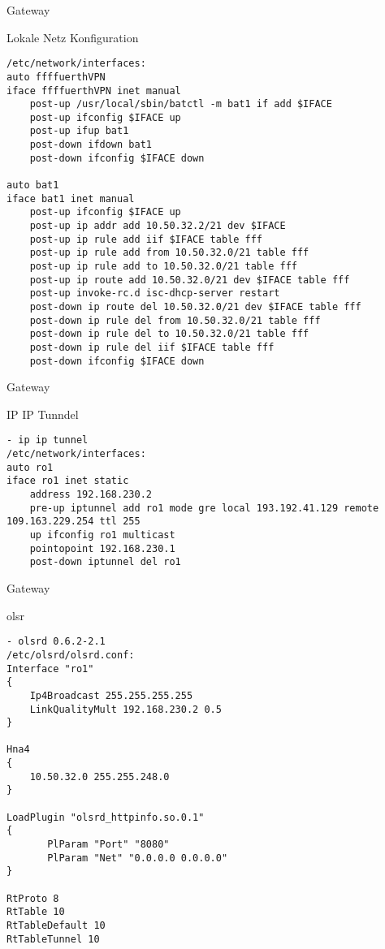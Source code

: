 \begin{frame}[fragile]{Gateway}
    \begin{block}{Lokale Netz Konfiguration}
        \begin{lstlisting}
/etc/network/interfaces:
auto ffffuerthVPN
iface ffffuerthVPN inet manual
    post-up /usr/local/sbin/batctl -m bat1 if add $IFACE
    post-up ifconfig $IFACE up
    post-up ifup bat1
    post-down ifdown bat1
    post-down ifconfig $IFACE down

auto bat1
iface bat1 inet manual
    post-up ifconfig $IFACE up
    post-up ip addr add 10.50.32.2/21 dev $IFACE
    post-up ip rule add iif $IFACE table fff
    post-up ip rule add from 10.50.32.0/21 table fff
    post-up ip rule add to 10.50.32.0/21 table fff
    post-up ip route add 10.50.32.0/21 dev $IFACE table fff
    post-up invoke-rc.d isc-dhcp-server restart
    post-down ip route del 10.50.32.0/21 dev $IFACE table fff
    post-down ip rule del from 10.50.32.0/21 table fff
    post-down ip rule del to 10.50.32.0/21 table fff
    post-down ip rule del iif $IFACE table fff
    post-down ifconfig $IFACE down
        \end{lstlisting}
    \end{block}
\end{frame}

\begin{frame}[fragile]{Gateway}
    \begin{block}{IP IP Tunndel}
        \begin{lstlisting}
- ip ip tunnel
/etc/network/interfaces:
auto ro1
iface ro1 inet static
    address 192.168.230.2
    pre-up iptunnel add ro1 mode gre local 193.192.41.129 remote 109.163.229.254 ttl 255
    up ifconfig ro1 multicast
    pointopoint 192.168.230.1
    post-down iptunnel del ro1
        \end{lstlisting}
    \end{block}
\end{frame}

\begin{frame}[fragile]{Gateway}
    \begin{block}{olsr}
        \begin{lstlisting}
- olsrd 0.6.2-2.1
/etc/olsrd/olsrd.conf:
Interface "ro1"
{
    Ip4Broadcast 255.255.255.255
    LinkQualityMult 192.168.230.2 0.5
}

Hna4
{
    10.50.32.0 255.255.248.0
}

LoadPlugin "olsrd_httpinfo.so.0.1"
{
       PlParam "Port" "8080"
       PlParam "Net" "0.0.0.0 0.0.0.0"
}

RtProto 8
RtTable 10
RtTableDefault 10
RtTableTunnel 10
        \end{lstlisting}
    \end{block}
\end{frame}

